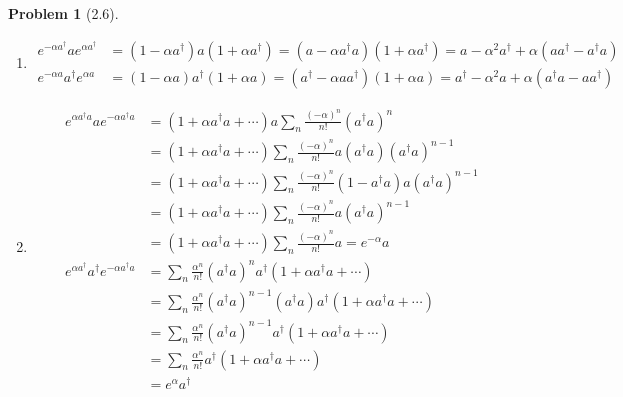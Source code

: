 \documentclass[twoside,11pt]{article}
\theoremstyle{definition}
\newtheorem{problem}{Problem}
\theoremstyle{remark}
\begin{document}
\begin{problem}[2.6]\
\begin{enumerate}[label=(\alph*)]
\item 
\begin{align*}
    e^{-\alpha a^\dagger} a e^{\alpha a^\dagger}
    &= (1 - \alpha a^\dagger) a (1 + \alpha a^\dagger)
    = (a - \alpha a^\dagger a)(1 + \alpha a^\dagger)
    = a - \alpha^2 a^\dagger + \alpha(aa^\dagger - a^\dagger a)\\
    e^{-\alpha a} a^\dagger e^{\alpha a}
    &= (1 - \alpha a) a^\dagger (1 + \alpha a)
    = (a^\dagger - \alpha aa^\dagger) (1+\alpha a)
    = a^\dagger - \alpha^2 a + \alpha(a^\dagger a - aa^\dagger)
\end{align*}

\item 
\begin{align*}
    e^{\alpha a^\dagger a}a e^{-\alpha a^\dagger a}
    &= 
    (1 + \alpha a^\dagger a + \cdots) a \sum_n \frac{(-\alpha)^n}{n!}(a^\dagger a)^n\\
    &= (1 + \alpha a^\dagger a + \cdots) \sum_n\frac{(-\alpha)^n}{n!}a(a^\dagger a)(a^\dagger a)^{n-1}\\
    &= (1 + \alpha a^\dagger a + \cdots) \sum_n\frac{(-\alpha)^n}{n!}(1-a^\dagger a)a(a^\dagger a)^{n-1}\\
    &= (1 + \alpha a^\dagger a + \cdots) \sum_n\frac{(-\alpha)^n}{n!}a(a^\dagger a)^{n-1}\\
    &= (1 + \alpha a^\dagger a + \cdots) \sum_n\frac{(-\alpha)^n}{n!}a = e^{-\alpha} a\\
    e^{\alpha a^\dagger}a^\dagger e^{-\alpha a^\dagger a}
    &= \sum_n\frac{\alpha^n}{n!}(a^\dagger a)^n a^\dagger (1 + \alpha a^\dagger a + \cdots)\\
    &= \sum_n\frac{\alpha^n}{n!}(a^\dagger a)^{n-1}(a^\dagger a)a^\dagger (1 + \alpha a^\dagger a + \cdots)\\
    &= \sum_n\frac{\alpha^n}{n!}(a^\dagger a)^{n-1} a^\dagger(1 + \alpha a^\dagger a + \cdots)\\
    &= \sum_n\frac{\alpha^n}{n!}a^\dagger (1 + \alpha a^\dagger a + \cdots)\\
    &= e^{\alpha}a^\dagger
\end{align*}

\end{enumerate}
\end{problem}



\end{document}
